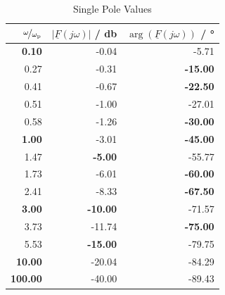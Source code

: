 \documentclass{article}[11pt]
\begin{document}
\begin{table}[H]
\centering
\caption{Single Pole Values}
\begin{tabular}{rrr}
\toprule
$\nicefrac{\omega}{\omega_{\mathrm{p}}}$  & $\left|\underline{F}(j\omega)\right|$ / \si{\decibel} & $\arg\left(\underline{F}(j\omega)\right)$ / \si{\degree} \\ \midrule
\textbf{0.10}                             & -0.04                                                 & -5.71                                                    \\ 
0.27                                      & -0.31                                                 & \textbf{-15.00}                                          \\ 
0.41                                      & -0.67                                                 & \textbf{-22.50}                                          \\ 
0.51                                      & -1.00                                                 & -27.01                                                   \\ 
0.58                                      & -1.26                                                 & \textbf{-30.00}                                          \\ 
\textbf{1.00}                             & -3.01                                                 & \textbf{-45.00}                                          \\ 
1.47                                      & \textbf{-5.00}                                        & -55.77                                                   \\ 
1.73                                      & -6.01                                                 & \textbf{-60.00}                                          \\ 
2.41                                      & -8.33                                                 & \textbf{-67.50}                                          \\ 
\textbf{3.00}                             & \textbf{-10.00}                                       & -71.57                                                   \\ 
3.73                                      & -11.74                                                & \textbf{-75.00}                                          \\ 
5.53                                      & \textbf{-15.00}                                       & -79.75                                                   \\ 
\textbf{10.00}                            & -20.04                                                & -84.29                                                   \\
\textbf{100.00}                           & -40.00                                                & -89.43                                                   \\  \toprule
\end{tabular}
\label{tab:single-pole}
\end{table}
\end{document}

